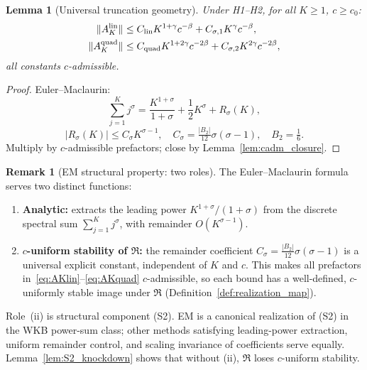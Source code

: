 \documentclass[12pt,a4paper]{amsart}
\newtheorem{lemma}[theorem]{Lemma}
\theoremstyle{definition}
\newtheorem{remark}[theorem]{Remark}
\newcommand{\normh}[2]{\|#1\|_{#2}}
\newcommand{\AKlin}{A_K^{\mathrm{lin}}}
\newcommand{\AKquad}{A_K^{\mathrm{quad}}}
\begin{document}
\begin{lemma}[Universal truncation geometry]
\label{lem:trunc_universal}
Under H1--H2, for all $K\geq 1$, $c\geq c_0$:
\begin{align}
  \normh{\AKlin}{}
    &\leq C_{\rm lin}K^{1+\gamma}c^{-\beta}
    +C_{\sigma,1}K^\gamma c^{-\beta},
    \label{eq:AKlin}\\
  \normh{\AKquad}{}
    &\leq C_{\rm quad}K^{1+2\gamma}c^{-2\beta}
    +C_{\sigma,2}K^{2\gamma}c^{-2\beta},
    \label{eq:AKquad}
\end{align}
all constants $c$-admissible.
\end{lemma}

\begin{proof}
Euler--Maclaurin:
\begin{equation}\label{eq:EM}
  \sum_{j=1}^K j^\sigma
  =\frac{K^{1+\sigma}}{1+\sigma}+\frac{1}{2}K^\sigma+R_\sigma(K),
\end{equation}
\begin{equation}\label{eq:EM_remainder}
  |R_\sigma(K)|\leq C_\sigma K^{\sigma-1},\quad
  C_\sigma=\tfrac{|B_2|}{12}\sigma(\sigma-1),\quad B_2=\tfrac{1}{6}.
\end{equation}
Multiply by $c$-admissible prefactors; close by Lemma~\ref{lem:cadm_closure}.
\end{proof}

\begin{remark}[EM structural property: two roles]
\label{rem:EM_growth}
The Euler--Maclaurin formula serves two distinct functions:
\begin{enumerate}[nosep,label=(\roman*)]
  \item \textbf{Analytic:}
    extracts the leading power $K^{1+\sigma}/(1+\sigma)$
    from the discrete spectral sum $\sum_{j=1}^K j^\sigma$,
    with remainder $O(K^{\sigma-1})$.
  \item \textbf{$c$-uniform stability of $\mathfrak{R}$:}
    the remainder coefficient $C_\sigma = \frac{|B_2|}{12}\sigma(\sigma-1)$
    is a universal explicit constant, independent of $K$ and $c$.
    This makes all prefactors in~\eqref{eq:AKlin}--\eqref{eq:AKquad}
    $c$-admissible, so each bound has a well-defined,
    $c$-uniformly stable image under $\mathfrak{R}$
    (Definition~\ref{def:realization_map}).
\end{enumerate}
Role~(ii) is structural component (S2).
EM is a canonical realization of (S2) in the WKB power-sum class;
other methods satisfying leading-power extraction,
uniform remainder control, and scaling invariance of coefficients
serve equally.
Lemma~\ref{lem:S2_knockdown} shows that without (ii),
$\mathfrak{R}$ loses $c$-uniform stability.
\end{remark}
\end{document}
